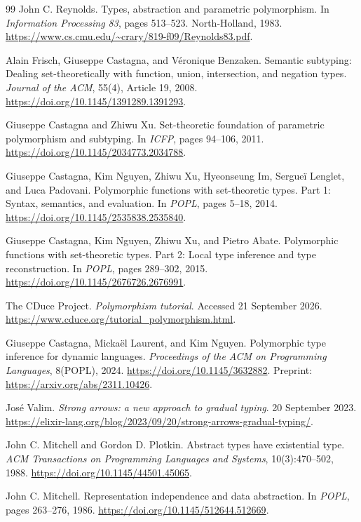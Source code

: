 \documentclass[11pt,a4paper,oneside]{report}
\theoremstyle{remark}
\begin{document}
\begin{thebibliography}{99}
John C. Reynolds.
Types, abstraction and parametric polymorphism.
In \emph{Information Processing 83}, pages 513--523. North-Holland, 1983.
\url{https://www.cs.cmu.edu/~crary/819-f09/Reynolds83.pdf}.

Alain Frisch, Giuseppe Castagna, and V\'eronique Benzaken.
Semantic subtyping: Dealing set-theoretically with function, union, intersection,
and negation types.
\emph{Journal of the ACM}, 55(4), Article 19, 2008.
\url{https://doi.org/10.1145/1391289.1391293}.

Giuseppe Castagna and Zhiwu Xu.
Set-theoretic foundation of parametric polymorphism and subtyping.
In \emph{ICFP}, pages 94--106, 2011.
\url{https://doi.org/10.1145/2034773.2034788}.

Giuseppe Castagna, Kim Nguyen, Zhiwu Xu, Hyeonseung Im, Sergue\"i Lenglet,
and Luca Padovani.
Polymorphic functions with set-theoretic types. Part 1: Syntax, semantics,
and evaluation.
In \emph{POPL}, pages 5--18, 2014.
\url{https://doi.org/10.1145/2535838.2535840}.

Giuseppe Castagna, Kim Nguyen, Zhiwu Xu, and Pietro Abate.
Polymorphic functions with set-theoretic types. Part 2: Local type inference
and type reconstruction.
In \emph{POPL}, pages 289--302, 2015.
\url{https://doi.org/10.1145/2676726.2676991}.

The CDuce Project.
\emph{Polymorphism tutorial}.
Accessed 21 September 2026.
\url{https://www.cduce.org/tutorial_polymorphism.html}.

Giuseppe Castagna, Micka\"el Laurent, and Kim Nguyen.
Polymorphic type inference for dynamic languages.
\emph{Proceedings of the ACM on Programming Languages}, 8(POPL), 2024.
\url{https://doi.org/10.1145/3632882}.
Preprint: \url{https://arxiv.org/abs/2311.10426}.

Jos\'e Valim.
\emph{Strong arrows: a new approach to gradual typing}.
20 September 2023.
\url{https://elixir-lang.org/blog/2023/09/20/strong-arrows-gradual-typing/}.

John C. Mitchell and Gordon D. Plotkin.
Abstract types have existential type.
\emph{ACM Transactions on Programming Languages and Systems},
10(3):470--502, 1988.
\url{https://doi.org/10.1145/44501.45065}.

John C. Mitchell.
Representation independence and data abstraction.
In \emph{POPL}, pages 263--276, 1986.
\url{https://doi.org/10.1145/512644.512669}.


\end{thebibliography}
\end{document}
